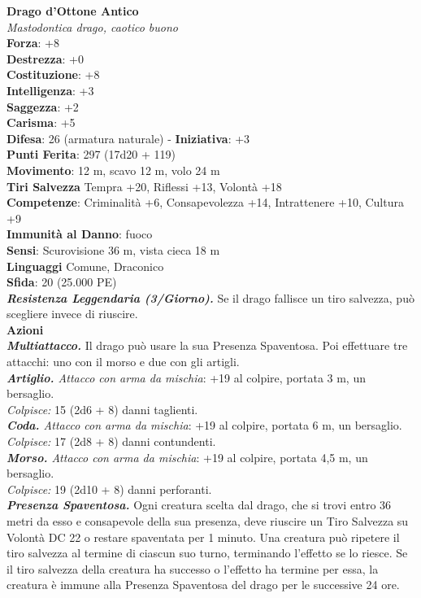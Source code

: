 \begin{multicols}{2}
\medskip\textbf{Drago d'Ottone Antico}\\
\emph{Mastodontica drago, caotico buono}\\
\textbf{Forza}: +8\\
\textbf{Destrezza}: +0\\
\textbf{Costituzione}: +8\\
\textbf{Intelligenza}: +3\\
\textbf{Saggezza}: +2\\
\textbf{Carisma}: +5\\
\textbf{Difesa}: 26 (armatura naturale) - \textbf{Iniziativa}: +3\\
\textbf{Punti Ferita}: 297 (17d20 + 119)\\
\textbf{Movimento}: 12 m, scavo 12 m, volo 24 m\\
\textbf{Tiri Salvezza} Tempra +20, Riflessi +13, Volontà +18\\
\textbf{Competenze}: Criminalità +6, Consapevolezza +14, Intrattenere +10, Cultura +9\\
\textbf{Immunità al Danno}: fuoco\\
\textbf{Sensi}: Scurovisione 36 m, vista cieca 18 m\\
\textbf{Linguaggi} Comune, Draconico\\
\textbf{Sfida}: 20 (25.000 PE)\smallskip\\
\emph{\textbf{Resistenza Leggendaria (3/Giorno).}} Se il drago fallisce un tiro salvezza, può scegliere invece di riuscire.\\
\smallskip\textbf{Azioni}\\
\emph{\textbf{Multiattacco.}} Il drago può usare la sua Presenza Spaventosa. Poi effettuare tre attacchi: uno con il morso e due con gli artigli.\\
\emph{\textbf{Artiglio.} Attacco con arma da mischia}: +19 al colpire, portata 3 m, un bersaglio.\\
\emph{Colpisce:} 15 (2d6 + 8) danni taglienti.\\
\emph{\textbf{Coda.} Attacco con arma da mischia}: +19 al colpire, portata 6 m, un bersaglio.\\
\emph{Colpisce:} 17 (2d8 + 8) danni contundenti.\\
\emph{\textbf{Morso.} Attacco con arma da mischia}: +19 al colpire, portata 4,5 m, un bersaglio.\\
\emph{Colpisce:} 19 (2d10 + 8) danni perforanti.\\
\emph{\textbf{Presenza Spaventosa.}} Ogni creatura scelta dal drago, che si trovi entro 36 metri da esso e consapevole della sua presenza, deve riuscire un Tiro Salvezza su Volontà DC  22 o restare spaventata per 1 minuto. Una creatura può ripetere il tiro salvezza al termine di ciascun suo turno,  terminando l'effetto se lo riesce. Se il tiro salvezza della creatura ha successo o l'effetto ha termine per essa, la creatura è  immune alla Presenza Spaventosa del drago per le successive 24 ore.\\

\end{multicols}
